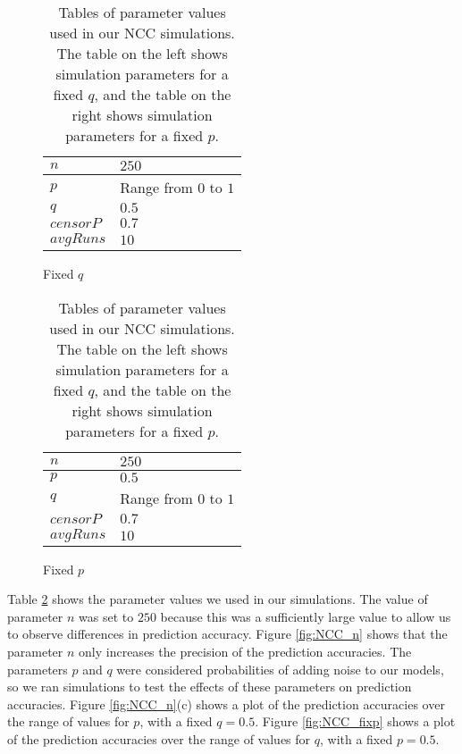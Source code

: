 \begin{table}[H]
\centering
\begin{subfigure}[h]{0.4\linewidth}
\begin{tabular}{|l|l|}
\hline
$n$ & $250$ \\ \hline
$p$ & Range from $0$ to $1$\\ \hline
$q$ & $0.5$\\ \hline
$censorP$ & $0.7$\\ \hline
$avgRuns$ & $10$\\ \hline
\end{tabular}
\caption{Fixed $q$}
\end{subfigure}
\hfill
\begin{subfigure}[h]{0.4\linewidth}
\begin{tabular}{|l|l|}
\hline
$n$ & $250$ \\ \hline
$p$ & $0.5$\\ \hline
$q$ & Range from $0$ to $1$\\ \hline
$censorP$ & $0.7$\\ \hline
$avgRuns$ & $10$\\ \hline
\end{tabular}
\caption{Fixed $p$}
\end{subfigure}%
\caption{Tables of parameter values used in our NCC simulations. The table
on the left shows simulation parameters for a fixed $q$, and the table on
the right shows simulation parameters for a fixed $p$.}
\label{table:NCC-params}
\end{table}

Table \ref{table:NCC-params} shows the parameter values we used in our
simulations. The value of parameter $n$ was set to $250$ because this was a
sufficiently large value to allow us to observe differences in prediction
accuracy. Figure \ref{fig:NCC_n} shows that the parameter $n$ only
increases the precision of the prediction accuracies. The parameters $p$
and $q$ were considered probabilities of adding noise to our models, so we
ran simulations to test the effects of these parameters on prediction
accuracies. Figure \ref{fig:NCC_n}(c) shows a plot of the prediction
accuracies over the range of values for $p$, with a fixed $q=0.5$. Figure
\ref{fig:NCC_fixp} shows a plot of the prediction accuracies over the range
of values for $q$, with a fixed $p=0.5$.

